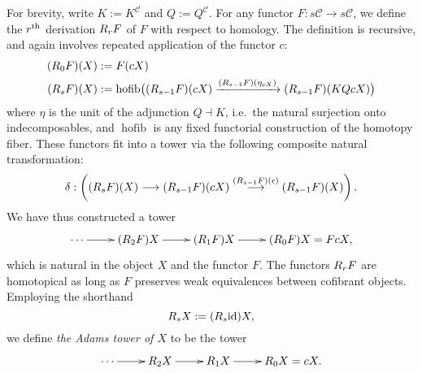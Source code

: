 \documentclass[11pt]{amsart} \renewcommand{\baselinestretch}{1.2}
\theoremstyle{plain}
\numberwithin{equation}{section} %
\theoremstyle{plain}
\numberwithin{equation}{chapter} %
\DeclareMathOperator*{\hofib}{hofib}
\renewcommand{\to}{\longrightarrow}
\newcommand{\calc}{\mathcal{C}}
\newcommand{\Id}{\mathrm{id}}
\newcommand{\algcat}{{\calc}}%
\newcommand{\dupdown}[2]{R_{\smash{#1}}}
\begin{document}
\begin{Bousfield-Kan spectral sequence}
For brevity, write $K:= K^{\calc}$ and $Q:=Q^{\calc}$. For any functor $F:s\algcat\to s\algcat$, we define the $r^\textup{th}$ derivation $\dupdown{r}{c}F$ of $F$ with respect to  homology. The definition is recursive, and again involves repeated application of the functor $c$: 
\begin{alignat*}{2}
(\dupdown{0}{c}F)(X)
&:=
F(cX)%
\\
(\dupdown{s}{c}F)(X)
&:=
\hofib\bigl((\dupdown{s-1}{c}F)(cX)\xrightarrow{(\dupdown{s-1}{c}F)(\eta_{cX})} (\dupdown{s-1}{c}F)(KQcX)\bigr)
\end{alignat*}
where $\eta$ is the unit of the adjunction $Q\dashv K$, i.e.\ the natural surjection onto indecomposables, and $\hofib$ is any fixed  functorial construction of the homotopy fiber. These functors fit into a tower via the following composite natural transformation:
\[\delta:\left((\dupdown{s}{c}F)(X)\to (\dupdown{s-1}{c}F)(cX)\overset{(\dupdown{s-1}{c}F)(\epsilon)}{\to} (\dupdown{s-1}{c}F)(X)\right).\]
We have thus constructed a tower
\[\xymatrix@R=4mm{
\cdots 
\ar[r]
&%
(\dupdown{2}{c}F)X
\ar[r]
&%
(\dupdown{1}{c}F)X
\ar[r]&%
(\dupdown{0}{c}F)X=FcX,
}\]%
which is natural in the object $X$ and the functor $F$.
The functors $\dupdown{r}{c}F$ are homotopical as long as $F$ preserves weak equivalences between cofibrant objects. Employing the shorthand
\[\dupdown{s}{c}X:=(\dupdown{s}{c}\Id )X,\]
we define \emph{the Adams tower of $X$} to be the tower
\[\xymatrix@R=4mm{
\cdots 
\ar[r]
&%
\dupdown{2}{c}X
\ar[r]
&%
\dupdown{1}{c}X
\ar[r]&%
\dupdown{0}{c}X=cX.
}\]


\end{Bousfield-Kan spectral sequence}
\end{document}
